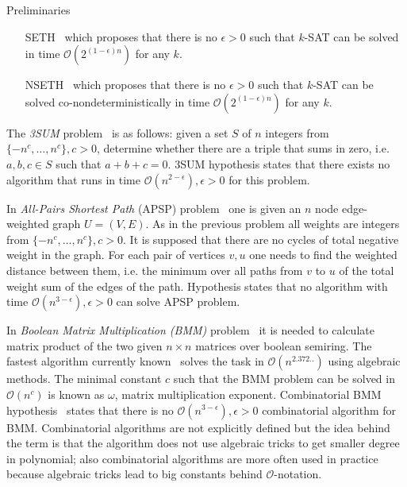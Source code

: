 \documentclass[12pt]{article}
\begin{document}
\begin{section}{Preliminaries}
	\begin{itemize}
	    \item[SETH~\cite{10.1006/jcss.2000.1727}] which proposes that there is no $\epsilon > 0$ such that $k$-SAT can be solved in time $\mathcal{O}(2^{(1 - \epsilon) n})$ for any $k$.
	    \item[NSETH~\cite{10.1145/2840728.2840746}] which proposes that there is no $\epsilon > 0$ such that $k$-SAT can be solved co-nondeterministically in time $\mathcal{O}(2^{(1 - \epsilon) n})$ for any $k$.
	\end{itemize}
	
	The \textit{3SUM} problem~\cite{williams2018some} is as follows: given a set $S$ of $n$ integers from $\{- n^c, \ldots, n^c\}, c > 0$, determine whether there are a triple that sums in zero, i.e. $a, b, c \in S$ such that $a + b + c = 0$. 3SUM hypothesis states that there exists no algorithm that runs in time $\mathcal{O}(n^{2 - \epsilon}), \epsilon > 0$ for this problem.
	
	In \textit{All-Pairs Shortest Path} (APSP) problem~\cite{williams2018some} one is given an $n$ node edge-weighted graph $U = (V, E)$. As in the previous problem all weights are integers from $\{- n^c, \ldots, n^c\}, c > 0$. It is supposed that there are no cycles of total negative weight in the graph. For each pair of vertices $v, u$ one needs to find the weighted distance between them, i.e. the minimum over all paths from $v$ to $u$ of the total weight sum of the edges of the path. Hypothesis states that no algorithm with time $\mathcal{O}(n^{3 - \epsilon}), \epsilon > 0$ can solve APSP problem. 
	
	In \emph{Boolean Matrix Multiplication (BMM)} problem~\cite{williams2018some} it is needed to calculate matrix product of the two given $n \times n$ matrices over boolean semiring. The fastest algorithm currently known~\cite{10.5555/3458064.3458096} solves the task in $\mathcal{O}(n^{2.372..})$ using algebraic methods. The minimal constant $c$ such that the BMM problem can be solved in $\mathcal{O}(n^c)$ is known as $\omega$, matrix multiplication exponent. Combinatorial BMM hypothesis~\cite{10.1145/505241.505242} states that there is no $\mathcal{O}(n^{3 - \epsilon}), \epsilon > 0$ combinatorial algorithm for BMM. Combinatorial algorithms are not explicitly defined but the idea behind the term is that the algorithm does not use algebraic tricks to get smaller degree in polynomial; also combinatorial algorithms are more often used in practice because algebraic tricks lead to big constants behind $\mathcal{O}$-notation. 
	

\end{section}
\end{document}
